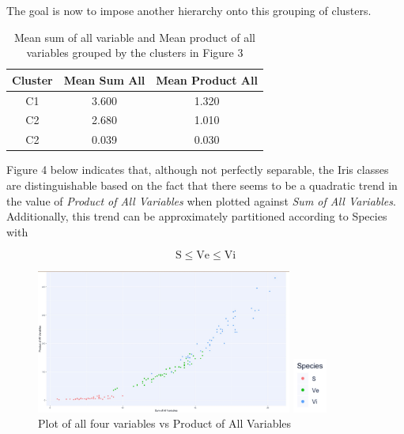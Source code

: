 \documentclass[12pt,]{article}
\begin{document}
The goal is now to impose another hierarchy onto this grouping of
clusters.

\begin{table}[h!]
\begin{center}
\begin{tabular}{|c|c|c|}
\hline
Cluster & Mean Sum All & Mean Product  All  \\
\hline
C1 & 3.600  & 1.320  \\
\hline
C2 & 2.680  & 1.010 \\ 
\hline
C2 & 0.039  & 0.030 \\ 
\hline
\end{tabular}
\end{center}
\caption[Meta Variables Grouped by Meta Clusters]{Mean sum of all variable and Mean product of all variables grouped by the clusters in Figure 3}
\end{table}

Figure 4 below indicates that, although not perfectly separable, the
Iris classes are distinguishable based on the fact that there seems to
be a quadratic trend in the value of \textit{Product of All Variables}
when plotted against \textit{Sum of All Variables}. Additionally, this
trend can be approximately partitioned according to Species with

\[
\text{S} \leq \text{Ve} \leq \text{Vi} \tag{EQ 1}
\]

\newpage

\begin{figure}[!h]
\begin{center}
\includegraphics[width=0.75\textwidth]{SumVProd.jpeg}

\vspace{5pt}

\includegraphics[width=0.1\textwidth]{KeyData.jpeg}
\end{center}
\caption[Iris Data Product Of All Variable Plot]{Plot of all four variables vs Product of All Variables}
\end{figure}
\end{document}
